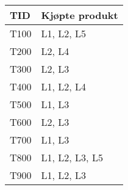 			\begin{table}[H]
				\begin{tabular}{| l | l | }
					\hline
						{\bf TID} & {\bf Kjøpte produkt} \\ \hline
						T100 & L1, L2, L5 \\ \hline
						T200 & L2, L4 \\ \hline
						T300 & L2, L3 \\ \hline
						T400 & L1, L2, L4 \\ \hline
						T500 & L1, L3 \\ \hline
						T600 & L2, L3 \\ \hline
						T700 & L1, L3 \\ \hline
						T800 & L1, L2, L3, L5 \\ \hline
						T900 & L1, L2, L3 \\ \hline
				\end{tabular}
			\end{table}

